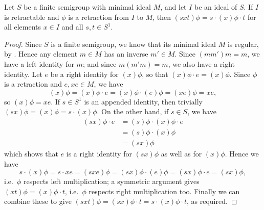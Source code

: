 \begin{lemma}
  \label{lem:retract-aux}
  Let $S$ be a finite semigroup with minimal ideal $M$, and let $I$ be
  an ideal of $S$.  If $I$ is retractable and $\phi$ is a
  retraction from $I$ to $M$, then $(sxt)\phi=s \cdot (x)\phi \cdot t$ for all
  elements $x \in I$ and all $s,t\in S^1$.
  \begin{proof}
    Since $S$ is a finite semigroup, we know that its minimal ideal $M$ is
    regular, by \cite[Proposition 3.1.4]{howie}.  Hence
    any element $m \in M$ has an inverse $m' \in M$.  Since $(mm')m = m$, we
    have a left identity for $m$; and since $m(m'm) = m$, we also have a right
    identity.  Let $e$ be a right identity for $(x)\phi$, so that
    $(x)\phi \cdot e = (x)\phi$.  Since $\phi$ is a retraction and
    $e, xe \in M$, we have
    $$(x)\phi=(x)\phi \cdot e = (x)\phi \cdot (e)\phi = (xe)\phi = xe,$$
    so $(x)\phi = xe$.
    If $s \in S^1$ is an appended identity, then trivially $(sx)\phi = (x)\phi =
    s \cdot (x)\phi$.  On the other hand, if $s \in S$, we have
    \begin{align*}
      (sx)\phi \cdot e & = (s)\phi \cdot (x)\phi \cdot e \\
                       & = (s)\phi \cdot (x)\phi \\
                       & = (sx)\phi
    \end{align*}
    which shows that $e$ is a right identity for $(sx)\phi$ as well as for
    $(x)\phi$.  Hence we have
    $$s \cdot (x)\phi = s \cdot xe = (sxe)\phi = (sx)\phi \cdot (e)\phi =
    (sx)\phi \cdot e = (sx)\phi,$$ i.e.~$\phi$ respects left multiplication; a
    symmetric argument gives $(xt)\phi = (x)\phi \cdot t$, i.e.~$\phi$ respects
    right multiplication too.  Finally we can combine these to give
    $(sxt)\phi = (sx)\phi \cdot t = s \cdot (x)\phi \cdot t$, as required.
  \end{proof}
\end{lemma}

